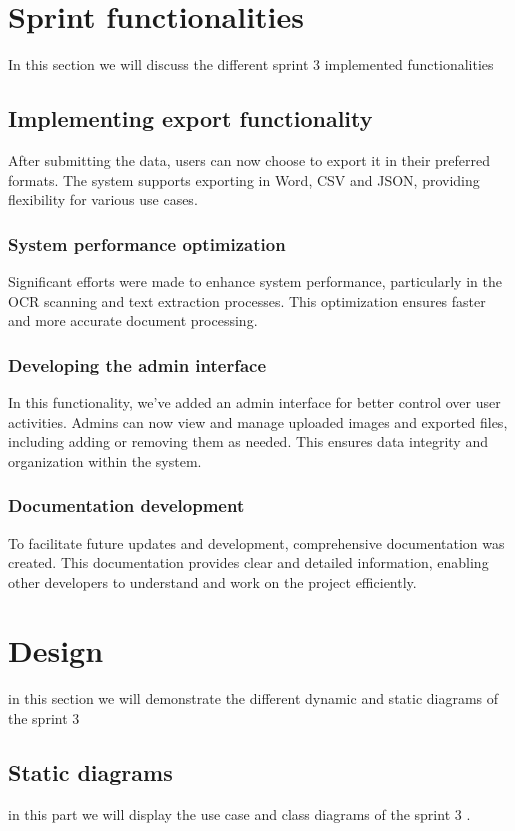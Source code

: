 \section{Sprint functionalities}
In this section we will discuss the different sprint 3 implemented functionalities
\subsection{Implementing export functionality }
After submitting the data, users can now choose to export it in their preferred formats. The system supports exporting in Word, CSV and JSON, providing flexibility for various use cases.
\subsubsection{System performance optimization}
Significant efforts were made to enhance system performance, particularly in the OCR scanning and text extraction processes. This optimization ensures faster and more accurate document processing.


\subsubsection{Developing the admin interface }
In this functionality, we've added an admin interface for better control over user activities. Admins can now view and manage uploaded images and exported files, including adding or removing them as needed. This ensures data integrity and organization within the system.

\subsubsection{Documentation development}

To facilitate future updates and development, comprehensive documentation was created. This documentation provides clear and detailed information, enabling other developers to understand and work on the project efficiently.

\section{Design}
in this section we will demonstrate the different dynamic and static
diagrams of the sprint 3
\newpage
\subsection{Static diagrams}
in this part we will display the use case and class diagrams of the sprint 3 .
